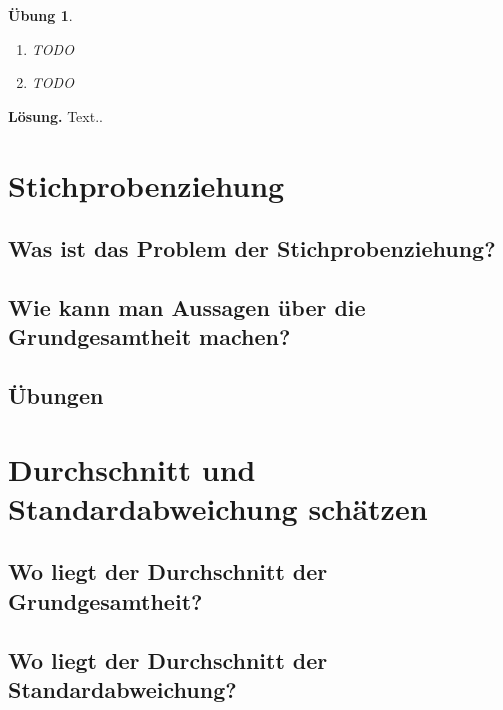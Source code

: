 \documentclass[
]{book}
\providecommand{\tightlist}{%
  \setlength{\itemsep}{0pt}\setlength{\parskip}{0pt}}
\newtheorem{exercise}{Übung}
\newenvironment{solution}{\par\textbf{Lösung.} }{\par}
\begin{document}
\begin{exercise}
\leavevmode

\begin{enumerate}
\def\labelenumi{(\alph{enumi})}
\tightlist
\item
  TODO
\item
  TODO
\end{enumerate}

\end{exercise}

\begin{solution}
Text..
\end{solution}

\chapter{Stichprobenziehung}\label{stichprobenziehung}

\section{Was ist das Problem der Stichprobenziehung?}\label{was-ist-das-problem-der-stichprobenziehung}

\section{Wie kann man Aussagen über die Grundgesamtheit machen?}\label{wie-kann-man-aussagen-uxfcber-die-grundgesamtheit-machen}

\section{Übungen}\label{uxfcbungen-1}

\chapter{Durchschnitt und Standardabweichung schätzen}\label{durchschnitt-und-standardabweichung-schuxe4tzen}

\section{Wo liegt der Durchschnitt der Grundgesamtheit?}\label{wo-liegt-der-durchschnitt-der-grundgesamtheit}

\section{Wo liegt der Durchschnitt der Standardabweichung?}\label{wo-liegt-der-durchschnitt-der-standardabweichung}
\end{document}

